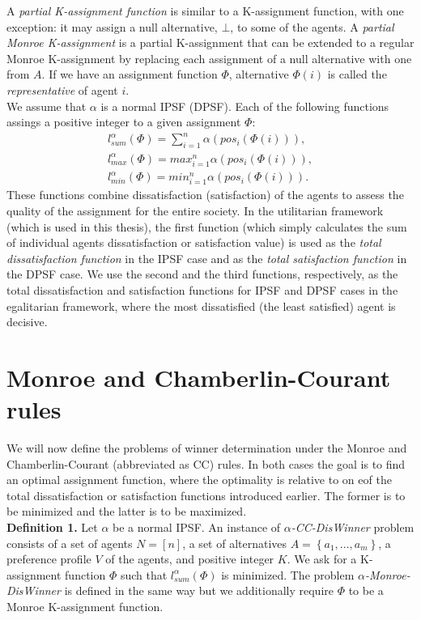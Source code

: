 A \textit{partial K-assignment function} is similar to a K-assignment function, with one exception: it may assign a null alternative, $\bot$, to some of the agents. A \textit{partial Monroe K-assignment} is a partial K-assignment that can be extended to a regular Monroe K-assignment by replacing each assignment of a null alternative with one from $A$. If we have an assignment function $\Phi$, alternative $\Phi(i)$ is called the \textit{representative} of agent $i$.
\\

We assume that $\alpha$ is a normal IPSF (DPSF). Each of the following functions assings a positive integer to a given assignment $\Phi$:
\begin{gather}
	l^{\alpha}_{sum}(\Phi) = \sum^{n}_{i=1} \alpha (pos_{i}(\Phi(i))),\\
	l^{\alpha}_{max}(\Phi) = max^{n}_{i=1} \alpha (pos_{i}(\Phi(i))),\\
	l^{\alpha}_{min}(\Phi) = min^{n}_{i=1} \alpha (pos_{i}(\Phi(i))).
\end{gather}
These functions combine dissatisfaction (satisfaction) of the agents to assess the quality of the assignment for the entire society. In the utilitarian framework (which is used in this thesis), the first function (which simply calculates the sum of individual agents dissatisfaction or satisfaction value) is used as the \textit{total dissatisfaction function} in the IPSF case and as the \textit{total satisfaction function} in the DPSF case. We use the second and the third functions, respectively, as the total dissatisfaction and satisfaction functions for IPSF and DPSF cases in the egalitarian framework, where the most dissatisfied (the least satisfied) agent is decisive.

\section{Monroe and Chamberlin-Courant rules}

We will now define the problems of winner determination under the Monroe and Chamberlin-Courant (abbreviated as CC) rules. In both cases the goal is to find an optimal assignment function, where the optimality is relative to on eof the total dissatisfaction or satisfaction functions introduced earlier. The former is to be minimized and the latter is to be maximized.
\\

\noindent
\textbf{Definition 1.} Let $\alpha$ be a normal IPSF. An instance of $\alpha$\textit{-CC-DisWinner} problem consists of a set of agents $N = [n]$, a set of alternatives $A = \left\{ a_{1}, \ldots, a_{m} \right\}$, a preference profile $V$ of the agents, and positive integer $K$. We ask for a K-assignment function $\Phi$ such that $l^{\alpha}_{sum}(\Phi)$ is minimized. The problem $\alpha$\textit{-Monroe-DisWinner} is defined in the same way but we additionally require $\Phi$ to be a Monroe K-assignment function.
\\


